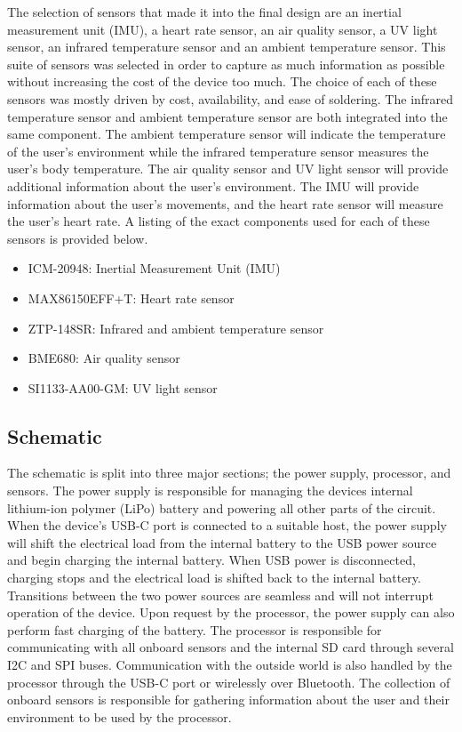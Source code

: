 The selection of sensors that made it into the final design are an inertial 
measurement unit (IMU), a heart rate sensor, an air quality sensor, a UV light 
sensor, an infrared temperature sensor and an ambient temperature sensor. This 
suite of sensors was selected in order to capture as much information as 
possible without increasing the cost of the device too much. The 
choice of each of these sensors was mostly driven by cost, availability, and 
ease of soldering. The infrared temperature sensor and ambient temperature 
sensor are both integrated into the same component. The ambient temperature 
sensor will indicate the temperature of the user’s environment while the 
infrared temperature sensor measures the user’s body temperature. The air 
quality sensor and UV light sensor will provide additional information about 
the user’s environment. The IMU will provide information about the user’s 
movements, and the heart rate sensor will measure the user’s heart rate. A 
listing of the exact components used for each of these sensors is provided 
below.

\begin{itemize}
   \item ICM-20948: Inertial Measurement Unit (IMU)
   \item MAX86150EFF+T: Heart rate sensor
   \item ZTP-148SR: Infrared and ambient temperature sensor
   \item BME680: Air quality sensor
   \item SI1133-AA00-GM: UV light sensor
\end{itemize}

\subsection{Schematic}

The schematic is split into three major sections; the power supply, 
processor, and sensors. The power supply is responsible for managing the 
devices internal lithium-ion polymer (LiPo) battery and powering all other 
parts of the circuit. When the device’s USB-C port is connected to a 
suitable host, the power supply will shift the electrical load from the 
internal battery to the USB power source and begin charging the internal 
battery. When USB power is disconnected, charging stops and the electrical load is 
shifted back to the internal battery. Transitions between the two power 
sources are seamless and will not interrupt operation of the 
device. Upon request by the processor, the power supply can also perform fast 
charging of the battery. The processor is responsible for communicating with 
all onboard sensors and the internal SD card through several I2C and SPI 
buses. Communication with the outside world is also handled by the processor
through the USB-C port or wirelessly over Bluetooth. The collection of onboard 
sensors is responsible for gathering information about the user and their 
environment to be used by the processor.

